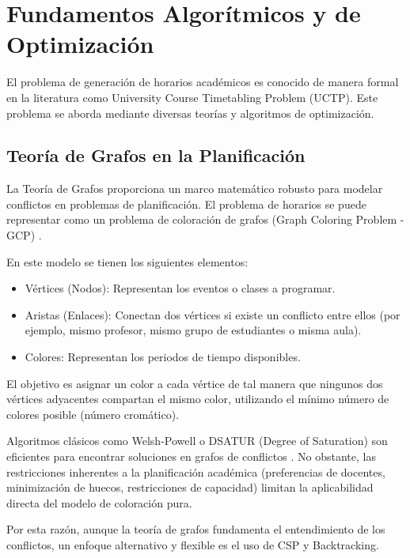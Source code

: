 \section{Fundamentos Algorítmicos y de Optimización}
\label{sec:algoritmia}

El problema de generación de horarios académicos es conocido de manera formal en la literatura como University Course Timetabling Problem (UCTP). Este problema se aborda mediante diversas teorías y algoritmos de optimización.

\subsection{Teoría de Grafos en la Planificación}
La Teoría de Grafos proporciona un marco matemático robusto para modelar conflictos en problemas de planificación. El problema de horarios se puede representar como un problema de coloración de grafos (Graph Coloring Problem - GCP) \cite{lewis2015guide}.

En este modelo se tienen los siguientes elementos:
\begin{itemize}
    \item Vértices (Nodos): Representan los eventos o clases a programar.
    \item Aristas (Enlaces): Conectan dos vértices si existe un conflicto entre ellos (por ejemplo, mismo profesor, mismo grupo de estudiantes o misma aula).
    \item Colores: Representan los periodos de tiempo disponibles.
\end{itemize}

El objetivo es asignar un color a cada vértice de tal manera que ningunos dos vértices adyacentes compartan el mismo color, utilizando el mínimo número de colores posible (número cromático).

Algoritmos clásicos como Welsh-Powell o DSATUR (Degree of Saturation) son eficientes para encontrar soluciones en grafos de conflictos \cite{burke2004-state}. No obstante, las restricciones inherentes a la planificación académica (preferencias de docentes, minimización de huecos, restricciones de capacidad) limitan la aplicabilidad directa del modelo de coloración pura.

Por esta razón, aunque la teoría de grafos fundamenta el entendimiento de los conflictos, un enfoque alternativo y flexible es el uso de CSP y Backtracking.

